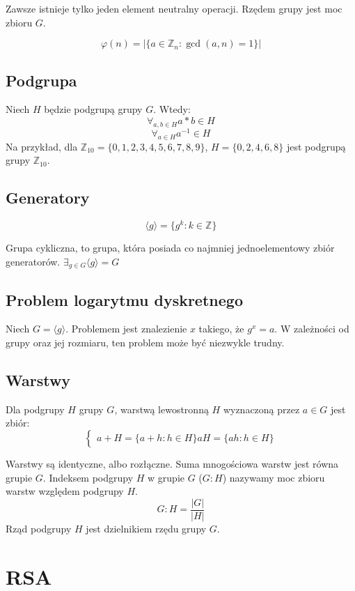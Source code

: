 \documentclass{../notatki}
\begin{document}
Zawsze istnieje tylko jeden element neutralny operacji.
Rzędem grupy jest moc zbioru $G$.

$$\varphi(n) = |\{a \in \mathbb{Z}_n : \gcd(a, n) = 1\}|$$

\subsection{Podgrupa}

Niech $H$ będzie podgrupą grupy $G$. Wtedy:
$$
\forall_{a, b \in H} a * b \in H
$$
$$
\forall_{a \in H} a^{-1} \in H
$$
Na przykład, dla $\mathbb{Z}_{10} = \{0, 1, 2, 3, 4, 5, 6, 7, 8, 9\}$,
$H = \{0, 2, 4, 6, 8\}$ jest podgrupą grupy $\mathbb{Z}_{10}$.

\subsection{Generatory}

$$
\langle g \rangle = \{g^k : k \in \mathbb{Z}\}
$$

Grupa cykliczna, to grupa, która posiada co najmniej jednoelementowy zbiór
generatorów. $\exists_{g \in G} \langle g \rangle = G$

\subsection{Problem logarytmu dyskretnego}

Niech $G = \langle g \rangle$. Problemem jest znalezienie $x$
takiego, że $g^x = a$. W zależności od grupy oraz jej rozmiaru,
ten problem może być niezwykle trudny.

\subsection{Warstwy}

Dla podgrupy $H$ grupy $G$, warstwą lewostronną $H$ wyznaczoną przez
$a \in G$ jest zbiór:
$$
\begin{cases}
  a + H = \{a + h : h \in H\}
  aH = \{ah : h \in H\}
\end{cases}
$$

Warstwy są identyczne, albo rozłączne. Suma mnogościowa warstw jest równa
grupie $G$. Indeksem podgrupy $H$ w grupie $G$ ($G : H$) nazywamy moc zbioru
warstw względem podgrupy $H$.
$$
G : H = \frac{|G|}{|H|}
$$
Rząd podgrupy $H$ jest dzielnikiem rzędu grupy $G$.

\section{RSA}
\end{document}

